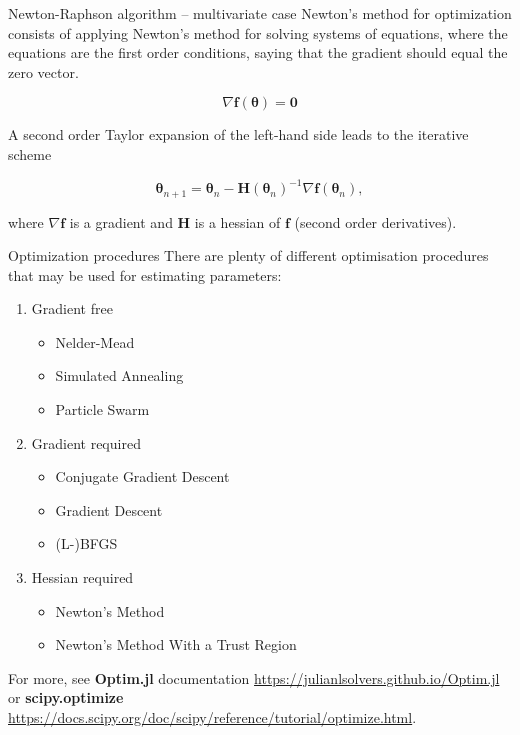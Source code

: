 \documentclass[10pt,ignorenonframetext,aspectratio=169]{beamer}
\begin{document}
\begin{frame}{Newton-Raphson algorithm -- multivariate case}
    Newton's method for optimization consists of applying Newton's method for solving systems of equations, where the equations are the first order conditions, saying that the gradient should equal the zero vector.
    
    \begin{equation}
        \nabla \boldsymbol{f}(\boldsymbol{\theta}) = \boldsymbol{0}
    \end{equation}
    
    A second order Taylor expansion of the left-hand side leads to the iterative scheme

\begin{equation}
    \boldsymbol{\theta}_{n+1} = \boldsymbol{\theta}_{n} - \boldsymbol{H}(\boldsymbol{\theta}_n)^{-1}\nabla \boldsymbol{f}(\boldsymbol{\theta}_n),
\end{equation}

where $\nabla \boldsymbol{f}$ is a gradient and $\boldsymbol{H}$ is a hessian of $\boldsymbol{f}$ (second order derivatives). 

\end{frame}

\begin{frame}{Optimization procedures}
    There are plenty of different optimisation procedures that may be used for estimating parameters:
    
    \begin{enumerate}
        \item Gradient free
        \begin{itemize}
            \item Nelder-Mead
            \item Simulated Annealing
            \item Particle Swarm
        \end{itemize}
        \item Gradient required
        \begin{itemize}
            \item Conjugate Gradient Descent
            \item Gradient Descent
            \item (L-)BFGS
        \end{itemize}
        \item Hessian required
            \begin{itemize}
                \item Newton's Method
                \item Newton's Method With a Trust Region
            \end{itemize}
    \end{enumerate}
    
    For more, see \textbf{Optim.jl} documentation \url{https://julianlsolvers.github.io/Optim.jl} or \textbf{scipy.optimize} \url{https://docs.scipy.org/doc/scipy/reference/tutorial/optimize.html}.
\end{frame}
\end{document}
